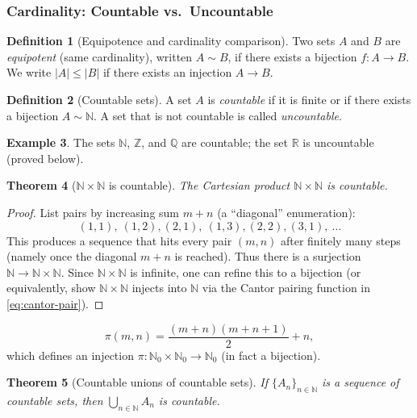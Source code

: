 \documentclass[12pt]{article}
\numberwithin{equation}{section}
\def\abs#1{|#1|}
\newcommand{\RR}{\mathbb{R}}
\newcommand{\QQ}{\mathbb{Q}}
\newcommand{\ZZ}{\mathbb{Z}}
\newcommand{\NN}{\mathbb{N}}
\DeclarePairedDelimiter{\abs}{\lvert}{\rvert}
\theoremstyle{plain}
\newtheorem{theorem}{Theorem}[section]
\theoremstyle{definition}
\newtheorem{definition}[theorem]{Definition}
\newtheorem{example}[theorem]{Example}
\theoremstyle{remark}
\begin{document}
\subsubsection{Cardinality: Countable vs.\ Uncountable}

\begin{definition}[Equipotence and cardinality comparison]
Two sets $A$ and $B$ are \emph{equipotent} (same cardinality), written $A\sim B$, if there exists a bijection $f:A\to B$.  
We write $\abs{A}\le \abs{B}$ if there exists an injection $A\to B$.
\end{definition}

\begin{definition}[Countable sets]
A set $A$ is \emph{countable} if it is finite or if there exists a bijection $A\sim \NN$.  
A set that is not countable is called \emph{uncountable}.
\end{definition}

\begin{example}
The sets $\NN$, $\ZZ$, and $\QQ$ are countable; the set $\RR$ is uncountable (proved below).
\end{example}

\begin{theorem}[$\NN\times\NN$ is countable]\label{thm:NxN}
The Cartesian product $\NN\times\NN$ is countable.
\end{theorem}

\begin{proof}
List pairs by increasing sum $m+n$ (a ``diagonal'' enumeration):
\[
(1,1),\ (1,2),(2,1),\ (1,3),(2,2),(3,1),\ \dots
\]
This produces a sequence that hits every pair $(m,n)$ after finitely many steps (namely once the diagonal $m+n$ is reached).  
Thus there is a surjection $\NN\to \NN\times\NN$. Since $\NN\times\NN$ is infinite, one can refine this to a bijection (or equivalently, show $\NN\times\NN$ injects into $\NN$ via the Cantor pairing function in \cref{eq:cantor-pair}).
\end{proof}

\begin{equation}\label{eq:cantor-pair}
\pi(m,n)=\frac{(m+n)(m+n+1)}{2}+n,
\end{equation}
which defines an injection $\pi:\NN_0\times\NN_0\to \NN_0$ (in fact a bijection).

\begin{theorem}[Countable unions of countable sets]\label{thm:countable-union}
If $\{A_n\}_{n\in\NN}$ is a sequence of countable sets, then $\bigcup_{n\in\NN} A_n$ is countable.
\end{theorem}
\end{document}
